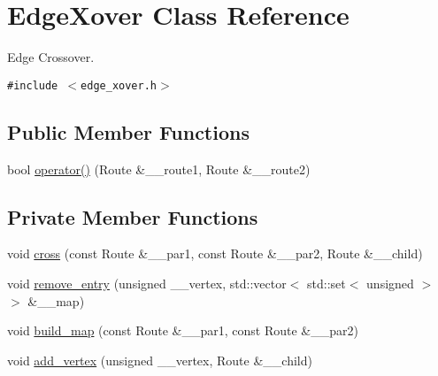 \hypertarget{classEdgeXover}{
\section{Edge\-Xover Class Reference}
\label{classEdgeXover}
}
Edge Crossover.  


{\tt \#include $<$edge\_\-xover.h$>$}

\subsection*{Public Member Functions}
\begin{CompactItemize}
\item 
\hypertarget{classEdgeXover_cb1c0a103106a4d3319540cb23163a79}{
bool \hyperlink{classEdgeXover_cb1c0a103106a4d3319540cb23163a79}{operator()} (Route \&\_\-\_\-route1, Route \&\_\-\_\-route2)}
\label{classEdgeXover_cb1c0a103106a4d3319540cb23163a79}

\end{CompactItemize}
\subsection*{Private Member Functions}
\begin{CompactItemize}
\item 
\hypertarget{classEdgeXover_88c2d4c9a878454a32d56010f3dddc27}{
void \hyperlink{classEdgeXover_88c2d4c9a878454a32d56010f3dddc27}{cross} (const Route \&\_\-\_\-par1, const Route \&\_\-\_\-par2, Route \&\_\-\_\-child)}
\label{classEdgeXover_88c2d4c9a878454a32d56010f3dddc27}

\item 
\hypertarget{classEdgeXover_1b3a4c75dd9a034c81af6d89d85d30f5}{
void \hyperlink{classEdgeXover_1b3a4c75dd9a034c81af6d89d85d30f5}{remove\_\-entry} (unsigned \_\-\_\-vertex, std::vector$<$ std::set$<$ unsigned $>$ $>$ \&\_\-\_\-map)}
\label{classEdgeXover_1b3a4c75dd9a034c81af6d89d85d30f5}

\item 
\hypertarget{classEdgeXover_04de96aa1016836e0ba5f4b952a5fa16}{
void \hyperlink{classEdgeXover_04de96aa1016836e0ba5f4b952a5fa16}{build\_\-map} (const Route \&\_\-\_\-par1, const Route \&\_\-\_\-par2)}
\label{classEdgeXover_04de96aa1016836e0ba5f4b952a5fa16}

\item 
\hypertarget{classEdgeXover_2d3045ef503d8b16a27e11fdc23ca11c}{
void \hyperlink{classEdgeXover_2d3045ef503d8b16a27e11fdc23ca11c}{add\_\-vertex} (unsigned \_\-\_\-vertex, Route \&\_\-\_\-child)}
\label{classEdgeXover_2d3045ef503d8b16a27e11fdc23ca11c}

\end{CompactItemize}
